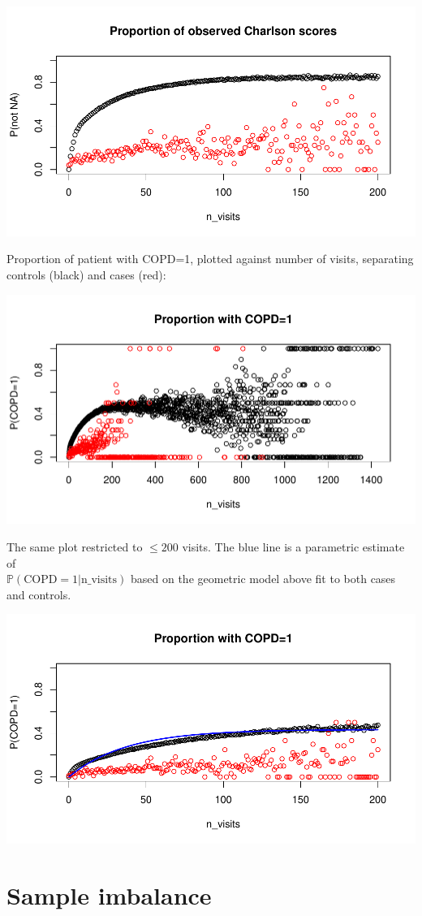 \documentclass[12pt]{article}
\begin{document}
\begin{center}
\includegraphics[width=.6\textwidth]{nvisits_scatter200.pdf}
\end{center}

Proportion of patient with COPD=1, plotted against number of visits, separating controls (black) and cases (red):

\begin{center}
\includegraphics[width=.6\textwidth]{nvisits_scatterCOPD.pdf}
\end{center}

The same plot restricted to $\leq 200$ visits. The blue line is a parametric estimate of \\ $\mathbb{P}(\text{COPD}=1 | \text{n\_visits})$ based on the geometric model above fit to both cases and controls.

\begin{center}
\includegraphics[width=.6\textwidth]{nvisits_scatterCOPD200.pdf}
\end{center}

\section*{Sample imbalance}
\end{document}
